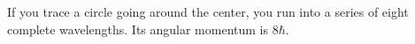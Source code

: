 If you trace a circle going around the center, you run into a series of
eight complete wavelengths. Its angular momentum is $8\hbar$.



